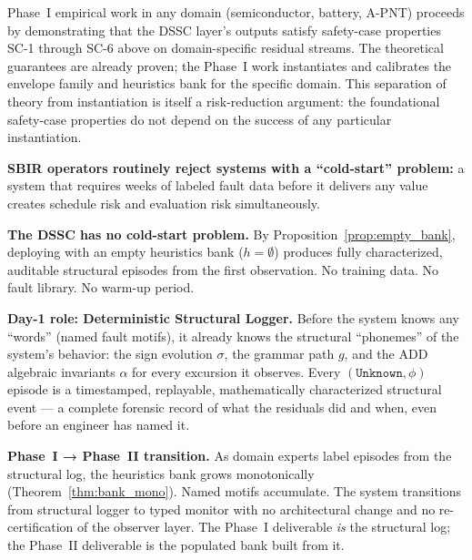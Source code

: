 \documentclass[11pt,a4paper]{article}
\theoremstyle{plain}
\theoremstyle{definition}
\theoremstyle{remark}
\begin{document}
Phase~I empirical work in any domain (semiconductor, battery, A-PNT) proceeds by demonstrating
that the DSSC layer's outputs satisfy safety-case properties SC-1 through SC-6 above on
domain-specific residual streams. The theoretical guarantees are already proven; the Phase~I
work instantiates and calibrates the envelope family and heuristics bank for the specific
domain. This separation of theory from instantiation is itself a risk-reduction argument: the
foundational safety-case properties do not depend on the success of any particular instantiation.

\begin{tcolorbox}[colback=green!4, colframe=green!55, boxrule=0.6pt, arc=3pt,
  left=7pt, right=7pt, top=6pt, bottom=6pt,
  title={\textbf{Phase~I Cold-Start Argument: The Deterministic Structural Logger}},
  fonttitle=\small\bfseries, coltitle=green!10!black]
\textbf{SBIR operators routinely reject systems with a ``cold-start'' problem:} a system
that requires weeks of labeled fault data before it delivers any value creates schedule
risk and evaluation risk simultaneously.

\medskip
\textbf{The DSSC has no cold-start problem.} By Proposition~\ref{prop:empty_bank}, deploying
with an empty heuristics bank ($h = \emptyset$) produces fully characterized, auditable
structural episodes from the first observation. No training data. No fault library. No
warm-up period.

\medskip
\textbf{Day-1 role: Deterministic Structural Logger.}
Before the system knows any ``words'' (named fault motifs), it already knows the structural
``phonemes'' of the system's behavior: the sign evolution $\sigma$, the grammar path $g$,
and the ADD algebraic invariants $\alpha$ for every excursion it observes. Every
$(\mathtt{Unknown}, \phi)$ episode is a timestamped, replayable, mathematically characterized
structural event --- a complete forensic record of what the residuals did and when, even
before an engineer has named it.

\medskip
\textbf{Phase~I → Phase~II transition.}
As domain experts label episodes from the structural log, the heuristics bank grows
monotonically (Theorem~\ref{thm:bank_mono}). Named motifs accumulate. The system
transitions from structural logger to typed monitor with no architectural change and no
re-certification of the observer layer. The Phase~I deliverable \emph{is} the structural
log; the Phase~II deliverable is the populated bank built from it.
\end{tcolorbox}
\end{document}
